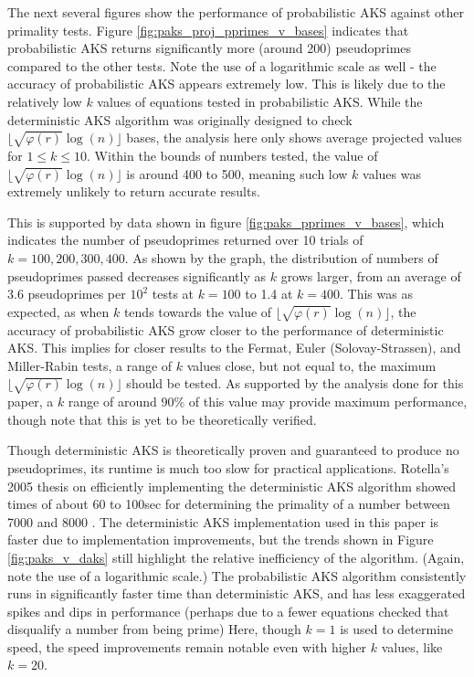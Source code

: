 \documentclass{article}
\begin{document}
The next several figures show the performance of probabilistic AKS against other primality tests. Figure \ref{fig:paks_proj_pprimes_v_bases} indicates that probabilistic AKS returns significantly more (around 200) pseudoprimes compared to the other tests. Note the use of a logarithmic scale as well - the accuracy of probabilistic AKS appears extremely low. This is likely due to the relatively low $k$ values of equations tested in probabilistic AKS. While the deterministic AKS algorithm was originally designed to check $\lfloor \sqrt{\varphi(r)}\log(n) \rfloor$ bases, the analysis here only shows average projected values for $1 \leq k \leq 10$. Within the bounds of numbers tested, the value of $\lfloor \sqrt{\varphi(r)}\log(n) \rfloor$ is around 400 to 500, meaning such low $k$ values was extremely unlikely to return accurate results.

This is supported by data shown in figure \ref{fig:paks_pprimes_v_bases}, which indicates the number of pseudoprimes returned over 10 trials of $k = 100, 200, 300, 400$. As shown by the graph, the distribution of numbers of pseudoprimes passed decreases significantly as $k$ grows larger, from an average of 3.6 pseudoprimes per $10^2$ tests at $k = 100$ to 1.4 at $k=400$. This was as expected, as when $k$ tends towards the value of $\lfloor \sqrt{\varphi(r)}\log(n) \rfloor$, the accuracy of probabilistic AKS grow closer to the performance of deterministic AKS. This implies for closer results to the Fermat, Euler (Solovay-Strassen), and Miller-Rabin tests, a range of $k$ values close, but not equal to, the maximum $\lfloor \sqrt{\varphi(r)}\log(n) \rfloor$ should be tested. As supported by the analysis done for this paper, a $k$ range of around 90\% of this value may provide maximum performance, though note that this is yet to be theoretically verified.

Though deterministic AKS is theoretically proven and guaranteed to produce no pseudoprimes, its runtime is much too slow for practical applications. Rotella's 2005 thesis on efficiently implementing the deterministic AKS algorithm showed times of about 60 to 100sec for determining the primality of a number between 7000 and 8000 \cite{rotella_efficient_2005}. The deterministic AKS implementation used in this paper is faster due to implementation improvements, but the trends shown in Figure \ref{fig:paks_v_daks} still highlight the relative inefficiency of the algorithm. (Again, note the use of a logarithmic scale.) The probabilistic AKS algorithm consistently runs in significantly faster time than deterministic AKS, and has less exaggerated spikes and dips in performance (perhaps due to a fewer equations checked that disqualify a number from being prime) Here, though $k=1$ is used to determine speed, the speed improvements remain notable even with higher $k$ values, like $k=20$.
\end{document}
